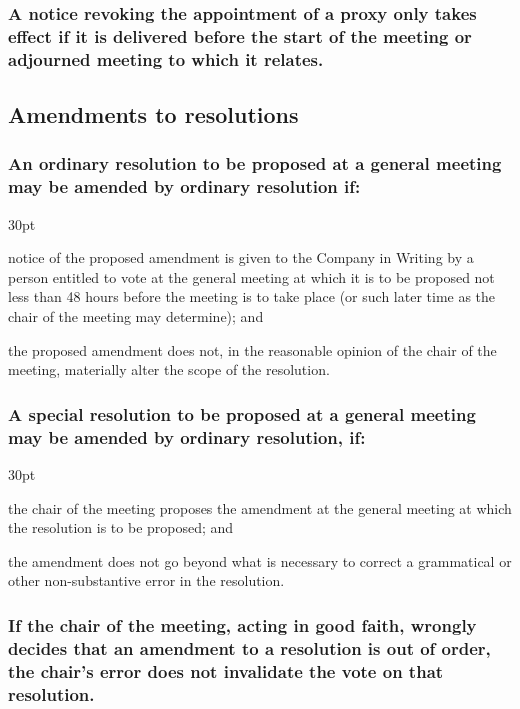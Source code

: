 \documentclass[12pt]{article}
\def\clauseindent{30pt}
\newenvironment{subindentpara}{\raggedright\begin{adjustwidth}{\clauseindent}{}\begin{hanginglist}}{\end{hanginglist}\end{adjustwidth}}
\begin{document}
\subsubsection[Specifics of revocation of proxy notices]{A notice revoking the appointment of a proxy only takes effect if it is delivered before the start of the meeting or adjourned meeting to which it relates.}

\subsection{Amendments to resolutions}
\subsubsection[Amendments to ordinary resolutions]{An ordinary resolution to be proposed at a general meeting may be amended by ordinary resolution if:}
\begin{subindentpara}
    \item notice of the proposed amendment is given to the Company in Writing by a person entitled to vote at the general meeting at which it is to be proposed not less than 48 hours before the meeting is to take place (or such later time as the chair of the meeting may determine); and
    \item the proposed amendment does not, in the reasonable opinion of the chair of the meeting, materially alter the scope of the resolution.
\end{subindentpara}
\subsubsection[Amendments to special resolutions]{A special resolution to be proposed at a general meeting may be amended by ordinary resolution, if:}
\begin{subindentpara}
    \item the chair of the meeting proposes the amendment at the general meeting at which the resolution is to be proposed; and
    \item the amendment does not go beyond what is necessary to correct a grammatical or other non-substantive error in the resolution.
\end{subindentpara}
\subsubsection[Amendments wrongly considered out of order]{If the chair of the meeting, acting in good faith, wrongly decides that an amendment to a resolution is out of order, the chair's error does not invalidate the vote on that resolution.}
\end{document}
